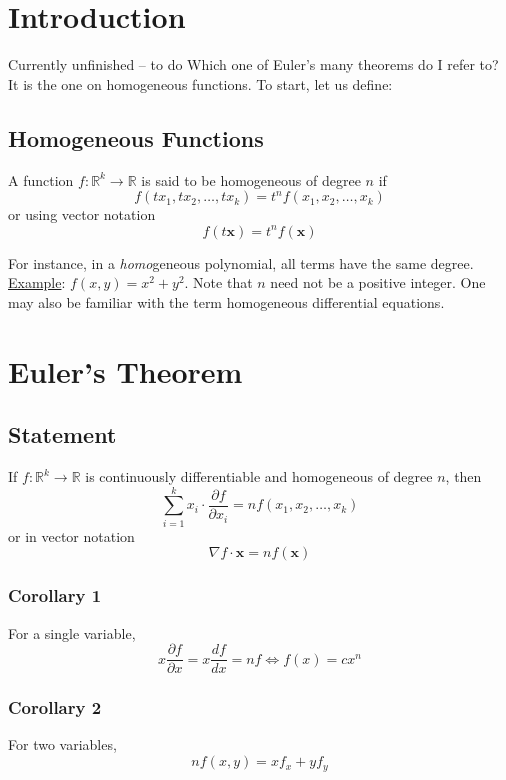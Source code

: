 \documentclass[11pt,a4paper]{article}
\title{\sc{Notes on Euler's Theorem}}
\author{\sc{Rahul}}
\date{\today}
\begin{document}
\maketitle

\section{Introduction}

Currently unfinished -- to do
Which one of Euler's many theorems do I refer to? It is the one on homogeneous functions. To start, let us define:

\subsection{Homogeneous Functions}
A function $f: \mathbb{R}^k \to \mathbb{R}$ is said to be homogeneous of degree $n$ if\[f(tx_1, tx_2, \dots, tx_k) = t^n f(x_1, x_2, \dots, x_k) \]or using vector notation
\[f(t \mathbf{x}) = t^n f(\mathbf{x})\]

For instance, in a \emph{homo}geneous polynomial, all terms have the same degree. \underline{Example}: $f(x, y) = x^2 + y^2$. Note that $n$ need not be a positive integer. One may also be familiar with the term homogeneous differential equations.

\section{Euler's Theorem}
\subsection{Statement}
If $f: \mathbb{R}^k \to \mathbb{R}$ is continuously differentiable and homogeneous of degree $n$, then
\[\sum_{i=1}^k x_i \cdot \frac{\partial f}{\partial x_i} = n f(x_1, x_2, \dots, x_k) \]or in vector notation\[\nabla f \cdot \mathbf{x} = n f(\mathbf{x})\]
\subsubsection{Corollary 1}
For a single variable, \[x \frac{\partial f}{\partial x} = x \frac{df}{dx} = nf \iff f(x) = cx^n\]
\subsubsection{Corollary 2}
For two variables,\[n f(x, y) = x f_x + y f_y\]
\end{document}
